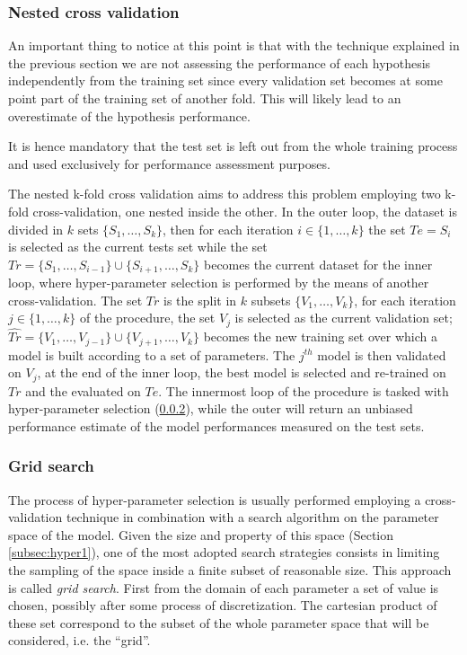 \subsubsection{Nested cross validation}
\label{subsubsec:ncv}
An important thing to notice at this point is that with the technique explained in
the previous section we are not assessing the performance of each hypothesis
independently from the training set since every validation set becomes at some
point part of the training set of another fold.
This will likely lead to an overestimate of the hypothesis performance.

It is hence mandatory that the test set is left out from the whole training
process and used exclusively for performance assessment purposes.

The nested k-fold cross validation aims to address this problem employing two
k-fold cross-validation, one nested inside the other.
In the outer loop, the dataset is divided in $k$ sets $\{S_1,\dots,S_k\}$, 
then for each iteration $i \in \{1,\dots,k\}$ the set $Te = S_i$ is selected as the
current tests set while the set $Tr = \{S_1,\dots,S_{i-1}\} \cup \{S_{i+1},\dots,S_k\}$
becomes the current dataset for the inner loop, where hyper-parameter selection
is performed by the means of another cross-validation.
The set $Tr$ is the split in $k$ subsets $\{V_1,\dots,V_k\}$, for each iteration
$j \in \{1,\dots,k\}$ of the procedure, the set $V_j$ is selected as the current
validation set; $\hat{Tr} = \{V_1,\dots,V_{j-1}\} \cup \{V_{j+1},\dots,V_k\}$
becomes the new training set over which a model is built according to a set of parameters.
The $j^{th}$ model is then validated on $V_j$, at the end of the inner loop, the
best model is selected and re-trained on $Tr$ and the evaluated on $Te$.
The innermost loop of the procedure is tasked with hyper-parameter selection (\ref{subsubsec:grid}),
while the outer will return an unbiased performance estimate of the model
performances measured on the test sets.

\subsubsection{Grid search}
\label{subsubsec:grid}
The process of hyper-parameter selection is usually performed employing a cross-validation
technique in combination with a search algorithm on the parameter space of the model.
Given the size and property of this space (Section \ref{subsec:hyper1}), one of the
most adopted search strategies consists in limiting the sampling of the space inside
a finite subset of reasonable size.
This approach is called \emph{grid search}. First from the domain of each parameter a 
set of value is chosen, possibly after some process of discretization.
The cartesian product of these set correspond to the subset of the whole parameter
space that will be considered, i.e. the ``grid''.

